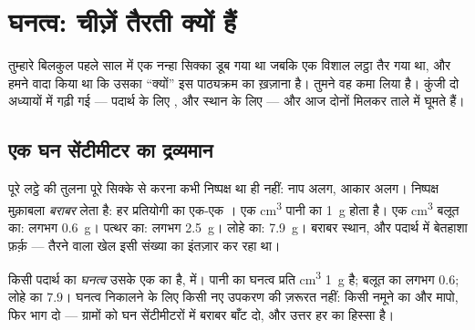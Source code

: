 \chapter{घनत्व: चीज़ें तैरती क्यों हैं}\label{ch:g6:density-floating}

तुम्हारे बिलकुल पहले साल में एक नन्हा सिक्का डूब गया था जबकि एक विशाल
लट्ठा तैर गया था, और हमने वादा किया था कि उसका ``क्यों'' इस पाठ्यक्रम
का ख़ज़ाना है। तुमने वह कमा लिया है। कुंजी दो अध्यायों में गढ़ी गई ---
पदार्थ के लिए , और स्थान के लिए  --- और आज दोनों मिलकर
ताले में घूमते हैं।

\section{एक घन सेंटीमीटर का द्रव्यमान}

\begin{example}[आख़िरकार निष्पक्ष तुलना]\label{ex:g6:density-floating:fair}
पूरे लट्ठे की तुलना पूरे सिक्के से करना कभी निष्पक्ष था ही नहीं: नाप
अलग, आकार अलग। निष्पक्ष मुक़ाबला \emph{बराबर } लेता है: हर
प्रतियोगी का एक-एक । एक \unit{cm^3} पानी का 
\qty{1}{g} होता है। एक \unit{cm^3} बलूत का: लगभग \qty{0.6}{g}।
पत्थर का: लगभग \qty{2.5}{g}। लोहे का: \qty{7.9}{g}। बराबर स्थान, और
पदार्थ में बेतहाशा फ़र्क़ --- तैरने वाला खेल इसी संख्या का इंतज़ार कर
रहा था।
\end{example}

\begin{definition}[घनत्व]\label{def:g6:density-floating:density}
किसी पदार्थ का \emph{घनत्व} उसके एक  का
 है,  में। पानी का घनत्व प्रति \unit{cm^3}
\qty{1}{g} है; बलूत का लगभग $0.6$; लोहे का $7.9$। घनत्व निकालने के
लिए किसी नए उपकरण की ज़रूरत नहीं: किसी नमूने का  और  मापो,
फिर भाग दो --- ग्रामों को घन सेंटीमीटरों में बराबर बाँट दो, और उत्तर
हर  का हिस्सा है।
\end{definition}

